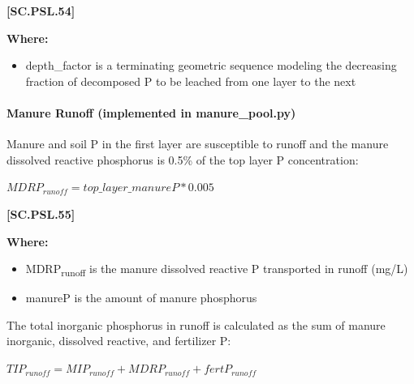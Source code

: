             {\raggedleft \textbf{[SC.PSL.54]}\par}
            \vspace{0.5cm}

        \textbf{Where:}
            
        \begin{itemize}
            \item depth\_factor is a terminating geometric sequence modeling the decreasing fraction of decomposed P to be leached from one layer to the next
        \end{itemize}
        \vspace{0.5cm}


\paragraph{Manure Runoff (implemented in manure\_pool.py)}
\vspace{0.2cm}

Manure and soil P in the first layer are susceptible to runoff and the manure dissolved reactive phosphorus is 0.5\% of the top layer P concentration:
            \vspace{0.5cm}
        
    \begin{center}
\(MDRP_{runoff} = top\_layer\_manureP * 0.005\)
    \end{center}
        \vspace{0.5cm} 
    
            {\raggedleft \textbf{[SC.PSL.55]}\par}
            \vspace{0.5cm}

        \textbf{Where:}
            
        \begin{itemize}
            \item MDRP\textsubscript{runoff} is the manure dissolved reactive P transported in runoff (mg/L)
            \item manureP is the amount of manure phosphorus
        \end{itemize}
            \vspace{0.5cm}
        
The total inorganic phosphorus in runoff is calculated as the sum of manure inorganic, dissolved reactive, and fertilizer P:
    \begin{center}
\(TIP_{runoff} = MIP_{runoff} + MDRP_{runoff} + fertP_{runoff}\)
    \end{center}
        \vspace{0.5cm} 
    
